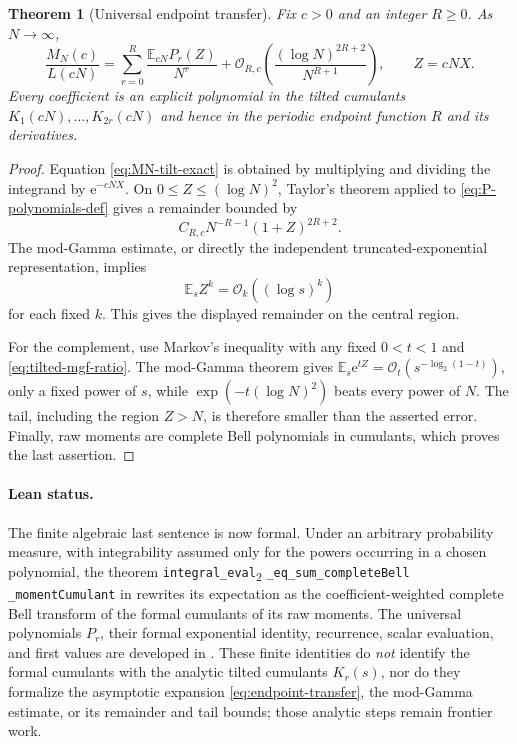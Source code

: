 \documentclass[11pt,oneside]{article}
\newtheorem{theorem}{Theorem}[section]
\theoremstyle{definition}
\theoremstyle{remark}
\newcommand{\e}{\mathrm e}
\newcommand{\E}{\mathbb E}
\newcommand{\bigO}{\mathcal O}
\begin{document}
\begin{theorem}[Universal endpoint transfer]\label{thm:endpoint-transfer}
Fix $c>0$ and an integer $R\ge0$.  As $N\to\infty$,
\begin{equation}\label{eq:endpoint-transfer}
 \boxed{
 \frac{M_N(c)}{L(cN)}=
 \sum_{r=0}^{R}\frac{\E_{cN}P_r(Z)}{N^r}
 +\bigO_{R,c}\!\left(
 \frac{(\log N)^{2R+2}}{N^{R+1}}\right),
 \qquad Z=cNX.}
\end{equation}
Every coefficient is an explicit polynomial in the tilted cumulants
$K_1(cN),\dots,K_{2r}(cN)$ and hence in the periodic endpoint function $R$ and
its derivatives.
\end{theorem}

\begin{proof}
Equation \cref{eq:MN-tilt-exact} is obtained by multiplying and dividing the
integrand by $\e^{-cNX}$.  On $0\le Z\le(\log N)^2$, Taylor's theorem applied
to \cref{eq:P-polynomials-def} gives a remainder bounded by
\[
 C_{R,c}N^{-R-1}(1+Z)^{2R+2}.
\]
The mod-Gamma estimate, or directly the independent truncated-exponential
representation, implies
\begin{equation}\label{eq:tilted-moment-bound}
 \E_sZ^k=\bigO_k((\log s)^k)
\end{equation}
for each fixed $k$.  This gives the displayed remainder on the central region.

For the complement, use Markov's inequality with any fixed $0<t<1$ and
\cref{eq:tilted-mgf-ratio}.  The mod-Gamma theorem gives
$\E_s\e^{tZ}=\bigO_t(s^{-\log_2(1-t)})$, only a fixed power of $s$, while
$\exp(-t(\log N)^2)$ beats every power of $N$.  The tail, including the region
$Z>N$, is therefore smaller than the asserted error.  Finally, raw moments are
complete Bell polynomials in cumulants, which proves the last assertion.
\end{proof}

\paragraph{Lean status.}
The finite algebraic last sentence is now formal.  Under an arbitrary
probability measure, with integrability assumed only for the powers occurring
in a chosen polynomial, the theorem
\texttt{integral\_eval}\textsubscript{2}\allowbreak
\texttt{\_eq\_sum\_completeBell}\allowbreak
\texttt{\_momentCumulant} in
 rewrites its expectation as the
coefficient-weighted complete Bell transform of the formal cumulants of its
raw moments.  The universal polynomials \(P_r\), their formal exponential
identity, recurrence, scalar evaluation, and first values are developed in
.  These finite identities do
\emph{not} identify the formal cumulants with the analytic tilted cumulants
\(K_r(s)\), nor do they formalize the asymptotic expansion
\eqref{eq:endpoint-transfer}, the mod-Gamma estimate, or its remainder and
tail bounds; those analytic steps remain frontier work.
\end{document}
